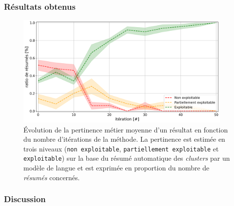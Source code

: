 		\subsubsection{Résultats obtenus}
		
			
			
			\begin{figure}[!htb]
				\centering
				\includegraphics[width=0.95\textwidth]{figures/etude-pertinence-llm-check-resume-annotation-favori}
				\caption{Évolution de la pertinence métier moyenne d'un résultat en fonction du nombre d'itérations de la méthode.
				La pertinence est estimée en trois niveaux (\texttt{non exploitable}, \texttt{partiellement exploitable} et \texttt{exploitable}) sur la base du résumé automatique des \textit{clusters} par un modèle de langue et est exprimée en proportion du nombre de \textit{résumés} concernés.}
				\label{figure:4.4.3-ETUDE-PERTINENCE-RESUME-AUTOMATIQUE}
			\end{figure}

		\subsubsection{Discussion}
		
			
	
